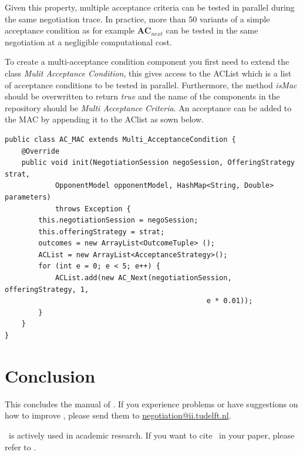 \documentclass[]{article}
\begin{document}
Given this property, multiple acceptance criteria can be tested in parallel during the same negotiation trace. In practice, more than 50 variants of a simple acceptance condition as for example $\textbf{AC}_{next}$ can be tested in the same negotiation at a negligible computational cost.

To create a multi-acceptance condition component you first need to extend the class \textit{Mulit Acceptance Condition}, this gives access to the ACList which is a list of acceptance conditions to be tested in parallel. Furthermore, the method \textit{isMac} should be overwritten to return \textit{true} and the name of the components in the repository should be \textit{Multi Acceptance Criteria}. An acceptance can be added to the MAC by appending it to the AClist as sown below. 

\begin{lstlisting}
public class AC_MAC extends Multi_AcceptanceCondition {
	@Override
	public void init(NegotiationSession negoSession, OfferingStrategy strat, 
			OpponentModel opponentModel, HashMap<String, Double> parameters)
			throws Exception {
		this.negotiationSession = negoSession;
		this.offeringStrategy = strat;
		outcomes = new ArrayList<OutcomeTuple> ();
		ACList = new ArrayList<AcceptanceStrategy>();
		for (int e = 0; e < 5; e++) {
			ACList.add(new AC_Next(negotiationSession, offeringStrategy, 1, 
												e * 0.01));
		}
	}
}

\end{lstlisting}

\section{Conclusion}
This concludes the manual of \Genius. If you experience problems or have suggestions on how to improve \Genius, please send them to \url{negotiation@ii.tudelft.nl}. 

\Genius\ is actively used in academic research. If you want to cite \Genius\ in your paper, please refer to \cite{Genius}.




\end{document}
